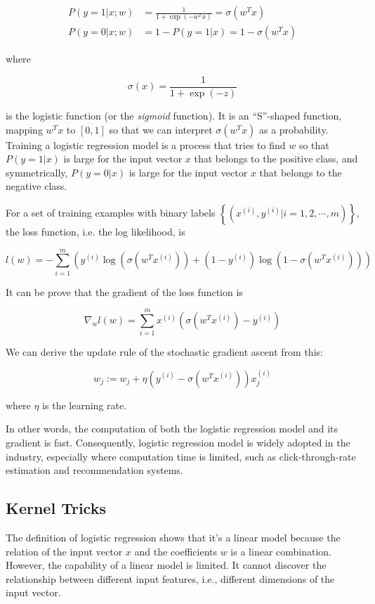     \begin{align*}
        P(y=1 | x;w) &= \frac{1}{1+\exp(-w^Tx)} = \sigma(w^Tx)\\
        P(y=0 | x;w) &= 1-P(y=1 | x) = 1-\sigma(w^Tx)
    \end{align*}

    where

    \[
    \sigma(x) = \frac{1}{1+\exp(-z)}
    \]

    is the logistic function (or the \emph{sigmoid} function).
    It is an ``S''-shaped function, mapping $w^Tx$ to $[0,1]$
    so that we can interpret $\sigma(w^Tx)$ as a probability.
    Training a logistic regression model is a process that tries to find $w$ so that
    $P(y=1 | x)$ is large for the input vector $x$ that belongs to the positive class,
    and symmetrically, $P(y=0 | x)$ is large for the input vector $x$ that belongs to the negative class.

    For a set of training examples with binary labels $\left\{ (x^{(i)}, y^{(i)} | i = 1, 2, \cdots, m) \right\}$,
    the loss function, i.e. the log likelihood, is

    \[
    l(w) = -\sum_{i=1}^m \left( y^{(i)}\log\left(\sigma(w^Tx^{(i)})\right) + (1-y^{(i)})\log\left(1-\sigma(w^Tx^{(i)})\right) \right)
    \]

    It can be prove \cite{Ng2000} that the gradient of the loss function is

    \[
    \nabla_w l(w) = \sum_{i=1}^m x^{(i)}\left(\sigma(w^Tx^{(i)}) - y^{(i)}\right)
    \]

    We can derive the update rule of the stochastic gradient ascent from this:

    \[
    w_j := w_j + \eta \left( y^{(i)} - \sigma(w^Tx^{(i)}) \right) x_j^{(i)}
    \]

    where $\eta$ is the learning rate.

    In other words, the computation of both the logistic regression model and its gradient is fast.
    Consequently, logistic regression model is widely adopted in the industry,
    especially where computation time is limited, such as click-through-rate estimation and recommendation systems.

    \subsection{Kernel Tricks}

        The definition of logistic regression shows that it's a linear model
        because the relation of the input vector $x$ and the coefficients $w$ is a linear combination.
        However, the capability of a linear model is limited.
        It cannot discover the relationship between different input features,
        i.e., different dimensions of the input vector.

